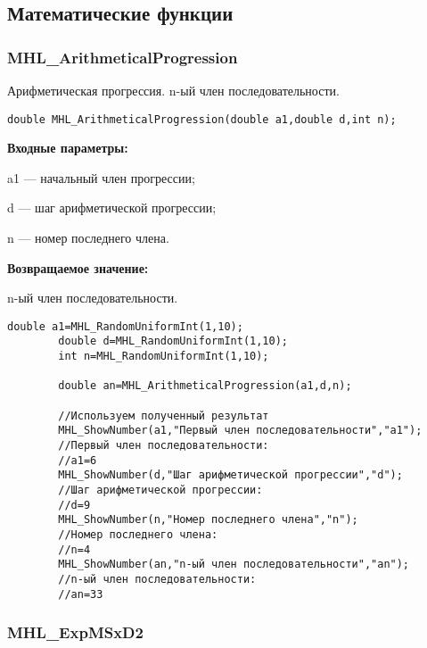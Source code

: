 \documentclass[a4paper,12pt]{article}
\begin{document}
\subsection{Математические функции}

\subsubsection{MHL\_ArithmeticalProgression}\label{MHL_ArithmeticalProgression}

Арифметическая прогрессия. n-ый член последовательности.


\begin{lstlisting}[label=code_syntax_MHL_ArithmeticalProgression,caption=Синтаксис]
double MHL_ArithmeticalProgression(double a1,double d,int n);
\end{lstlisting}

\textbf{Входные параметры:}  
 
a1 --- начальный член прогрессии;
 
d --- шаг арифметической прогрессии;
 
n --- номер последнего члена.

\textbf{Возвращаемое значение:}
 
n-ый член последовательности.


\begin{lstlisting}[label=code_use_MHL_ArithmeticalProgression,caption=Пример использования]
        double a1=MHL_RandomUniformInt(1,10);
        double d=MHL_RandomUniformInt(1,10);
        int n=MHL_RandomUniformInt(1,10);

        double an=MHL_ArithmeticalProgression(a1,d,n);

        //Используем полученный результат
        MHL_ShowNumber(a1,"Первый член последовательности","a1");
        //Первый член последовательности:
        //a1=6
        MHL_ShowNumber(d,"Шаг арифметической прогрессии","d");
        //Шаг арифметической прогрессии:
        //d=9
        MHL_ShowNumber(n,"Номер последнего члена","n");
        //Номер последнего члена:
        //n=4
        MHL_ShowNumber(an,"n-ый член последовательности","an");
        //n-ый член последовательности:
        //an=33
\end{lstlisting}

\subsubsection{MHL\_ExpMSxD2}\label{MHL_ExpMSxD2}
\end{document}
